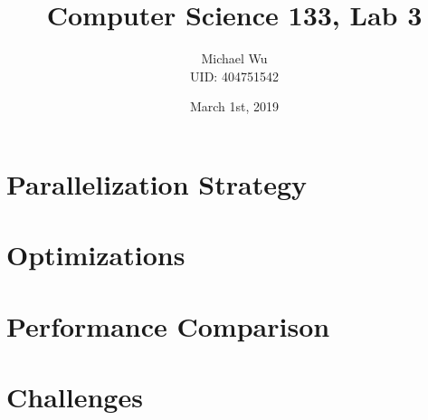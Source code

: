 \documentclass[12pt]{article}
\begin{document}
\title{Computer Science 133, Lab 3}
\date{March 1st, 2019}
\author{Michael Wu\\UID: 404751542}
\maketitle

\section{Parallelization Strategy}

\section{Optimizations}

\section{Performance Comparison}

\section{Challenges}
\end{document}
